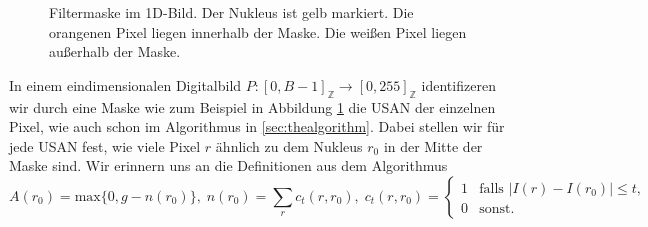 \documentclass[a4paper, 11pt]{report}
\theoremstyle{definition}
\begin{document}
				\begin{figure}[H]
					\begin{center}
						\caption{Filtermaske im 1D-Bild. Der Nukleus ist gelb markiert. Die orangenen Pixel liegen innerhalb der Maske. Die weißen Pixel liegen außerhalb der Maske.}
						\label{fig:def_maske_1d}
					\end{center}
				\end{figure}

	 			In einem eindimensionalen Digitalbild $P: [0,B-1]_\mathbb{Z} \to [0,255]_\mathbb{Z}$ identifizeren wir durch eine Maske wie zum Beispiel in Abbildung \ref{fig:def_maske_1d} die USAN der einzelnen Pixel, wie auch schon im Algorithmus in \ref{sec:thealgorithm}. Dabei stellen wir für jede USAN fest, wie viele Pixel $r$ ähnlich zu dem Nukleus $r_0$ in der Mitte der Maske sind. Wir erinnern uns an die Definitionen aus dem Algorithmus
				$$
				A(r_0) = \text{max}\{0, g - n(r_0)\},\;
				n(r_0) = \sum_r c_t(r, r_0),\;
				c_t(r, r_0) =
					\begin{cases}
						1 	& \text{falls } |I(r) - I(r_0)| \leq t, 	\\
						0 	& \text{sonst.}
					\end{cases}
				$$
\end{document}
